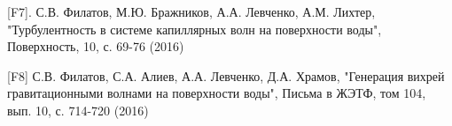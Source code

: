 [F7]. С.В. Филатов, М.Ю. Бражников, А.А. Левченко,  А.М. Лихтер, "Турбулентность в системе капиллярных волн на поверхности воды"{}, Поверхность, 10, с. 69-76 (2016)

[F8] С.В. Филатов, С.А. Алиев, А.А. Левченко, Д.А. Храмов, "Генерация вихрей гравитационными волнами на поверхности воды"{}, Письма в ЖЭТФ, том 104, вып.  10, с. 714-720 (2016)

%
\clearpage 








